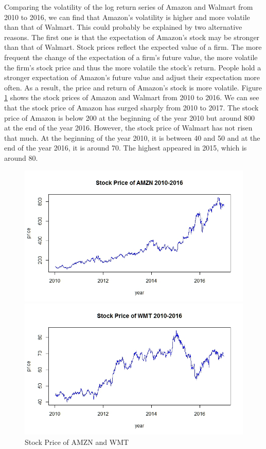 \documentclass[paper=a4, fontsize=11pt]{article}
\begin{document}
Comparing the volatility of the log return series of Amazon and Walmart from 2010 to 2016, we can find that Amazon’s volatility is higher and more volatile than that of Walmart. This could probably be explained by two alternative reasons. The first one is that the expectation of Amazon's stock may be stronger than that of Walmart. Stock prices reflect the expected value of a firm. The more frequent the change of the expectation of a firm's future value, the more volatile the firm's stock price and thus the more volatile the stock's return. People hold a stronger expectation of Amazon’s future value and adjust their expectation more often. As a result, the price and return of Amazon's stock is more volatile. Figure \ref{price} shows the stock prices of Amazon and Walmart from 2010 to 2016. We can see that the stock price of Amazon has surged sharply from 2010 to 2017. The stock price of Amazon is below 200 at the beginning of the year 2010 but around 800 at the end of the year 2016. However, the stock price of Walmart has not risen that much. At the beginning of the year 2010, it is between 40 and 50 and at the end of the year 2016, it is around 70. The highest appeared in 2015, which is around 80.

\begin{figure}[!htbp]
\begin{minipage}[!htbp]{0.5\linewidth}
\centering
\includegraphics[scale = 0.45]{img/price_AMZN}
\end{minipage}
\begin{minipage}[!htbp]{0.5\linewidth}
\centering
\includegraphics[scale = 0.45]{img/price_WMT}
\end{minipage}
\caption{Stock Price of AMZN and WMT}
\label{price}
\end{figure}
\end{document}

